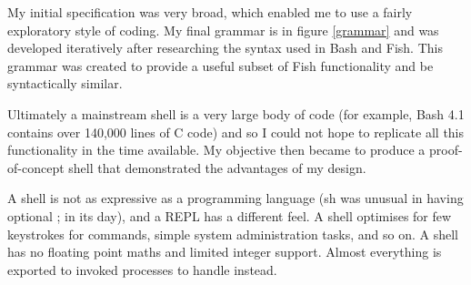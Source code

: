 \documentclass[12pt,twoside,notitlepage]{report}
\begin{document}
My initial specification was very broad, which enabled me to use a
fairly exploratory style of coding. My final grammar is in figure
\ref{grammar} and was developed iteratively after researching the
syntax used in Bash and Fish. This grammar was created to provide a
useful subset of Fish functionality and be syntactically similar.

Ultimately a mainstream shell is a very large body of code (for
example, Bash 4.1 contains over 140,000 lines of C
code\footnotemark[1]) and so I could not hope to replicate all this
functionality in the time available. My objective then became to
produce a proof-of-concept shell that demonstrated the advantages of
my design.




A shell is not as expressive as a programming language (sh was unusual in having
optional ; in its day), and a REPL has a different feel. A shell optimises for
few keystrokes for commands, simple system administration tasks, and so on. A
shell has no floating point maths and limited integer support. Almost everything
is exported to invoked processes to handle instead.


\end{document}
